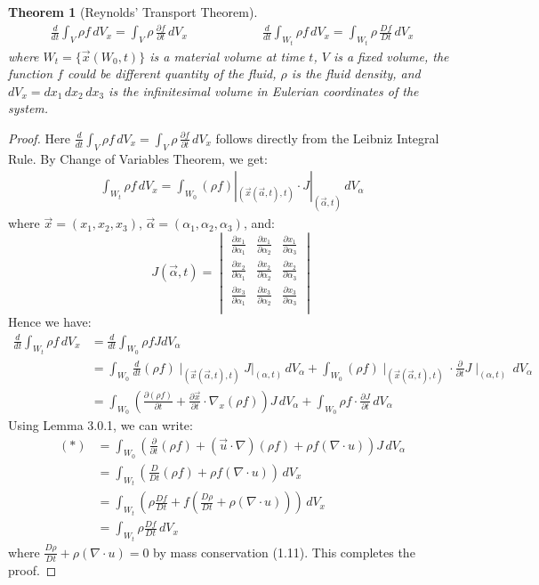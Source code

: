\documentclass[11pt]{book}
\theoremstyle{break}
\theoremstyle{break}
\newtheorem{thm}{Theorem}[section]
\newcommand{\vmat}[1]{\begin{vmatrix} #1 \end{vmatrix}}
\begin{document}
\begin{thm}[Reynolds' Transport Theorem]
\begin{align*}
\frac{d}{dt}\int_{V} \rho f \, dV_x = \int_{V} \rho\, \frac{\partial f}{\partial t}\, dV_x \qquad\qquad\qquad
\frac{d}{dt}\int_{W_t} \rho f \, dV_x = \int_{W_t} \rho\, \frac{Df}{Dt}\, dV_x
\end{align*}
where $W_t = \{ \vec{x}(W_0,t)\}$ is a material volume at time $t$, $V$ is a fixed volume, the function $f$ could be different quantity of the fluid, $\rho$ is the fluid density, and $dV_x = dx_1\,dx_2\,dx_3$ is the infinitesimal volume in Eulerian coordinates of the system.
\end{thm}
\begin{proof}
Here $\frac{d}{dt}\int_{V} \rho f \, dV_x = \int_{V} \rho\, \frac{\partial f}{\partial t}\, dV_x $ follows directly from the Leibniz Integral Rule. By Change of Variables Theorem, we get:
\begin{align*}
\int_{W_t}\rho f\, dV_x = \int_{W_0} (\rho f)|_{(\vec{x}(\vec{\alpha},t),t)} \cdot J|_{(\vec{\alpha},t)}\, dV_{\alpha} 
\end{align*}
where $\vec{x}=(x_1,x_2,x_3)$, $\vec{\alpha}=(\alpha_1,\alpha_2,\alpha_3)$, and:
$$J(\vec{\alpha},t) = \vmat{
\frac{\partial x_1}{\partial \alpha_1} & \frac{\partial x_1}{\partial \alpha_2} & \frac{\partial x_1}{\partial \alpha_3} \\ 
\frac{\partial x_2}{\partial \alpha_1} & \frac{\partial x_2}{\partial \alpha_2} & \frac{\partial x_2}{\partial \alpha_3} \\ 
\frac{\partial x_3}{\partial \alpha_1} & \frac{\partial x_3}{\partial \alpha_2} & \frac{\partial x_3}{\partial \alpha_3} \\ 
}$$
Hence we have:
\begin{align*}
\frac{d}{dt} \int_{W_t} \rho f \, dV_x 
&= \frac{d}{dt}\int_{W_0} \rho f J dV_\alpha\\
&= \int_{W_0} \frac{d}{dt}(\rho f) \mid_{(\vec{x}(\vec{\alpha}, t), t)} J|_{(\alpha,t)}\, dV_{\alpha} + \int_{W_0} (\rho f)\mid_{(\vec{x}(\vec{\alpha}, t), t)} \cdot \frac{\partial }{\partial t} J \mid_{(\alpha, t)}\, dV_{\alpha} \\
&= \int_{W_0} \left(\frac{\partial (\rho f)}{\partial t} + \frac{\partial \vec{x}}{\partial t} \cdot \nabla_x(\rho f) \right) J \, dV_{\alpha} + \int_{W_0} \rho f \cdot \frac{\partial J}{\partial t}  \, dV_{\alpha} \tag{*}
\end{align*}
Using Lemma 3.0.1, we can write:
\begin{align*}
(*)&= \int_{W_0} \left(\frac{\partial}{\partial t}(\rho f) + (\vec{u}\cdot \nabla) (\rho f) + \rho f (\nabla \cdot u) \right) J \, dV_{\alpha}\\
&= \int_{W_t} \left( \frac{D}{Dt} (\rho f) + \rho f(\nabla \cdot u)\right)\, dV_x\\
&= \int_{W_t} \left( \rho \frac{Df}{Dt} + f\left( \frac{D\rho}{Dt}+\rho (\nabla \cdot u)\right) \right) \, dV_x \\
&= \int_{W_t}  \rho \frac{Df}{Dt} \, dV_x
\end{align*}
where $\frac{D\rho}{Dt}+\rho (\nabla \cdot u)= 0$ by mass conservation (1.11). 
This completes the proof.
\end{proof}
\end{document}
